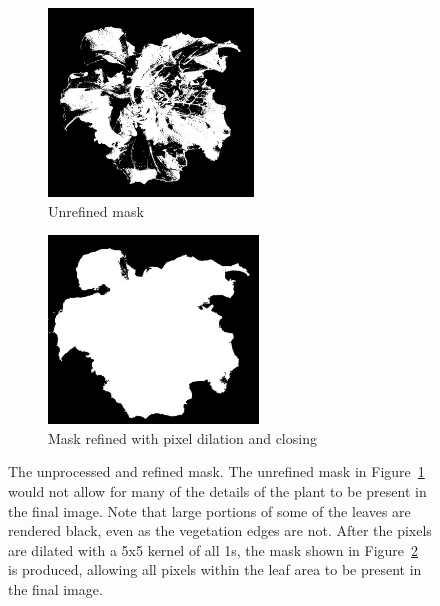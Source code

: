 \documentclass[letterpaper]{report}
\begin{document}
{\begin{figure}[h!]
	\centering
	\begin{subfigure}[h]{.48\textwidth}
	  \centering
	  \includegraphics[height=5cm]{./figures/mask-raw.jpg}
	  \caption{Unrefined mask}
	  \label{fig:mask-raw}
	\end{subfigure}
	\hfill
	\begin{subfigure}[h]{.48\textwidth}
	  \centering
	  \includegraphics[height=5cm]{./figures/mask-processed.jpg}
	  \caption{Mask refined with pixel dilation and closing}
	  \label{fig:mask-processed}
	\end{subfigure}
	\caption[Mask before and after morphological refinements]{The unprocessed and refined mask. The unrefined mask in Figure~\ref{fig:mask-raw} would not allow for many of the details of the plant to be present in the final image. Note that large portions of some of the leaves are rendered  black, even as the vegetation edges are not. After the pixels are dilated with a 5x5 kernel of all 1s, the mask shown in Figure~\ref{fig:mask-processed} is produced, allowing all pixels within the leaf area to be present in the final image.}
	\label{fig:mask-before-and-after}
\end{figure}

}
\end{document}
